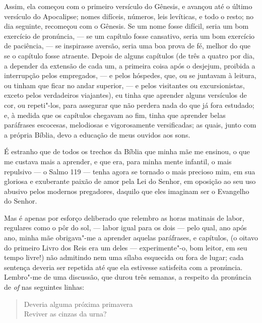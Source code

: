 Assim, ela começou com o primeiro versículo do Gênesis, e avançou até o
último versículo do Apocalipse; nomes difíceis, números, leis levíticas,
e todo o resto; no dia seguinte, recomeçou com o Gênesis. Se um nome
fosse difícil, seria um bom exercício de pronúncia, --- se um capítulo
fosse cansativo, seria um bom exercício de paciência, --- se inspirasse
aversão, seria uma boa prova de fé, melhor do que se o capítulo fosse
atraente. Depois de alguns capítulos (de três a quatro por dia, a
depender da extensão de cada um, a primeira coisa após o desjejum,
proibida a interrupção pelos empregados, --- e pelos hóspedes, que, ou se
juntavam à leitura, ou tinham que ficar no andar superior, --- e pelos
visitantes ou excursionistas, exceto pelos verdadeiros viajantes), eu
tinha que aprender alguns versículos de cor, ou repeti"-los, para
assegurar que não perdera nada do que já fora estudado; e, à medida que
os capítulos chegavam ao fim, tinha que aprender belas paráfrases
escocesas, melodiosas e vigorosamente versificadas; as quais, junto com
a própria Bíblia, devo a educação de meus ouvidos aos sons.

É estranho que de todos os trechos da Bíblia que minha mãe me ensinou, o
que me custava mais a aprender, e que era, para minha mente infantil, o
mais repulsivo --- o Salmo 119 --- tenha agora se tornado o mais
precioso mim, em sua gloriosa e exuberante paixão de amor pela Lei do
Senhor, em oposição ao seu uso abusivo pelos modernos pregadores,
daquilo que eles imaginam ser o Evangelho do Senhor.

Mas é apenas por esforço deliberado que relembro as horas matinais
de labor, regulares como o pôr do sol, --- labor igual para os dois ---
pelo qual, ano após ano, minha mãe obrigava"-me a aprender aquelas
paráfrases, e capítulos, (o oitavo do primeiro Livro dos Reis era um deles ---
experimente"-o, bom leitor, em seu tempo livre!) não admitindo nem uma
sílaba esquecida ou fora de lugar; cada sentença deveria ser repetida
até que ela estivesse satisfeita com a pronúncia. Lembro"-me de uma
discussão, que durou três semanas, a respeito da pronúncia de \textit{of} nas
seguintes linhas:

\begin{verse}
Deveria alguma próxima primavera\\
Reviver as cinzas da urna?\footnotemark
\end{verse}


